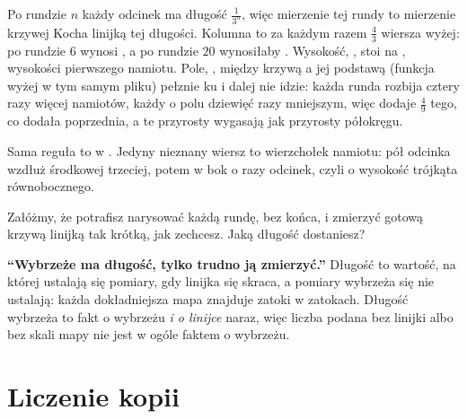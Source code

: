 

\noindent
Po rundzie $n$ każdy odcinek ma długość $\tfrac{1}{3^{n}}$, więc mierzenie
tej rundy to mierzenie krzywej Kocha linijką tej długości. Kolumna
 to za każdym razem $\tfrac{4}{3}$ wiersza wyżej: po rundzie $6$
wynosi , a po rundzie $20$ wynosiłaby
. Wysokość, , stoi na
, wysokości pierwszego namiotu. Pole, ,
między krzywą a jej podstawą (funkcja wyżej w tym samym pliku) pełznie ku
 i dalej nie idzie: każda runda rozbija cztery razy
więcej namiotów, każdy o polu dziewięć razy mniejszym, więc dodaje
$\tfrac{4}{9}$ tego, co dodała poprzednia, a te przyrosty wygasają jak
przyrosty półokręgu.

Sama reguła to  w . Jedyny nieznany wiersz to
wierzchołek namiotu: pół odcinka wzdłuż środkowej trzeciej, potem w bok o
 razy odcinek, czyli o wysokość trójkąta równobocznego.


\begin{think}
Załóżmy, że potrafisz narysować każdą rundę, bez końca, i zmierzyć gotową
krzywą linijką tak krótką, jak zechcesz. Jaką długość dostaniesz?
\end{think}

\begin{trapbox}
\textbf{\enquote{Wybrzeże ma długość, tylko trudno ją zmierzyć.}} Długość to
wartość, na której ustalają się pomiary, gdy linijka się skraca, a pomiary
wybrzeża się nie ustalają: każda dokładniejsza mapa znajduje zatoki w
zatokach. Długość wybrzeża to fakt o wybrzeżu \emph{i o linijce} naraz, więc
liczba podana bez linijki albo bez skali mapy nie jest w ogóle faktem o
wybrzeżu.
\end{trapbox}

\section{Liczenie kopii}
\label{sec:ch11-dimension}


